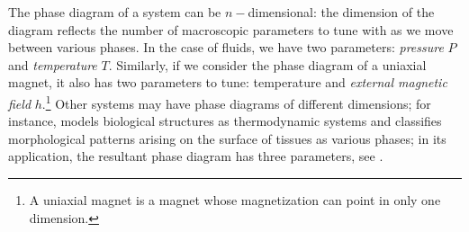 \documentclass[12pt]{article}
\numberwithin{equation}{section}
\begin{document}
The phase diagram of a system can be $n-$dimensional: the dimension of the diagram reflects the number of macroscopic parameters to tune with as we move between various phases. In the case of fluids, we have two parameters: \emph{pressure} $P$ and \emph{temperature} $T$. Similarly, if we consider the phase diagram of a uniaxial magnet, it also has two parameters to tune: temperature and \emph{external magnetic field} $h$.\footnote{A uniaxial magnet is a magnet whose magnetization can point in only one dimension.} Other systems may have phase diagrams of different dimensions; for instance, \cite{wang2015three} models biological structures as thermodynamic systems and classifies morphological patterns arising on the surface of  tissues as various phases; in its application, the resultant phase diagram has three parameters, see \figref{\ref{fig: phase diagram 2}}.
\end{document}
